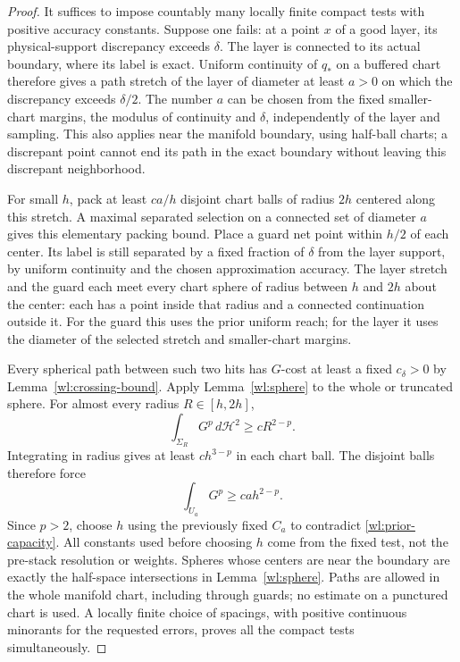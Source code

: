 \begin{proof}
It suffices to impose countably many locally finite compact tests
with positive accuracy constants.  Suppose one fails: at a point
$x$ of a good layer, its physical-support discrepancy exceeds
$\delta$.  The layer is connected to its actual boundary, where its
label is exact.  Uniform continuity of $q_*$ on a buffered chart
therefore gives a path stretch of the layer of diameter at least
$a>0$ on which the discrepancy exceeds $\delta/2$.  The number $a$
can be chosen from the fixed smaller-chart margins, the modulus of
continuity and $\delta$, independently of the layer and sampling.
This also applies near the manifold boundary, using half-ball
charts; a discrepant point cannot end its path in the exact boundary
without leaving this discrepant neighborhood.

For small $h$, pack at least $c a/h$ disjoint chart balls of radius
$2h$ centered along this stretch.  A maximal separated selection on a
connected set of diameter $a$ gives this elementary packing bound.
Place a guard net point within $h/2$ of each center.  Its label is
still separated by a fixed fraction of $\delta$ from the layer
support, by uniform continuity and the chosen approximation
accuracy.  The layer stretch and the guard each meet every chart
sphere of radius between $h$ and $2h$ about the center: each has a
point inside that radius and a connected continuation outside it.
For the guard this uses the prior uniform reach; for the layer it
uses the diameter of the selected stretch and smaller-chart
margins.

Every spherical path between such two hits has $G$-cost at least a
fixed $c_\delta>0$ by Lemma~\ref{wl:crossing-bound}.  Apply
Lemma~\ref{wl:sphere} to the whole or truncated sphere.  For almost
every radius $R\in[h,2h]$,
\[
 \int_{\Sigma_R}G^p\,d\mathcal H^2\geq cR^{2-p}.
\]
Integrating in radius gives at least $c h^{3-p}$ in each chart ball.
The disjoint balls therefore force
\begin{equation}\label{wl:barrier-divergence}
 \int_{U_a}G^p\geq c a h^{2-p}.
\end{equation}
Since $p>2$, choose $h$ using the previously fixed $C_a$ to contradict
\eqref{wl:prior-capacity}.  All constants used before choosing $h$
come from the fixed test, not the pre-stack resolution or weights.
Spheres whose centers are near the boundary are exactly the
half-space intersections in Lemma~\ref{wl:sphere}.  Paths are allowed
in the whole manifold chart, including through guards; no estimate
on a punctured chart is used.  A locally finite choice of spacings,
with positive continuous minorants for the requested errors, proves
all the compact tests simultaneously.
\end{proof}


